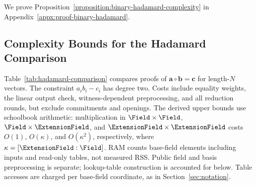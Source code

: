 We prove Proposition~\ref{proposition:binary-hadamard-complexity}
in Appendix~\ref{appx:proof-binary-hadamard}.

\clearpage

\subsection{Complexity Bounds for the Hadamard Comparison}
\label{appx:hadamard-comparison}

Table~\ref{tab:hadamard-comparison} compares proofs of
\(\bm a\circ\bm b=\bm c\) for length-\(N\) vectors.
The constraint \(a_i b_i-c_i\) has degree two. Costs include equality
weights, the linear output check, witness-dependent preprocessing, and all reduction
rounds, but exclude commitments and openings. The derived upper bounds
use schoolbook arithmetic: multiplication in
\(\Field\times\Field\), \(\Field\times\ExtensionField\), and
\(\ExtensionField\times\ExtensionField\) costs \(O(1)\),
\(O(\kappa)\), and \(O(\kappa^2)\), respectively, where
\(\kappa=[\ExtensionField:\Field]\). RAM counts base-field elements
including inputs and read-only tables, not measured RSS.
Public field and basis preprocessing is separate; lookup-table
construction is accounted for below. Table accesses are charged
per base-field coordinate, as in Section~\ref{sec:notation}.

